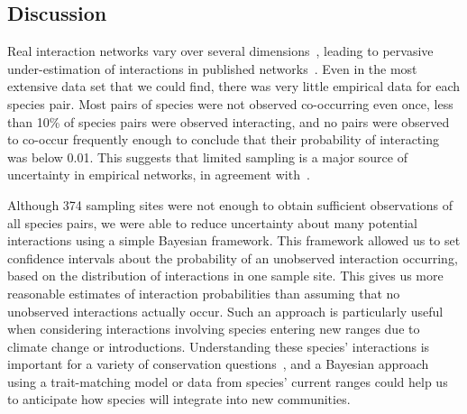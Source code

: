 \documentclass[12pt]{article}
\begin{document}
\begin{spacing}{2.0}

\section*{Discussion}


  Real interaction networks vary over several dimensions~\citep{Kitching1987,Olesen2011a,Pires2011a,Baiser2012,Fodrie2015,Novak2015}, leading to pervasive under-estimation of interactions in published networks~\citep{Jordano2016}. Even in the most extensive data set that we could find, there was very little empirical data for each species pair. Most pairs of species were not observed co-occurring even once, less than 10\% of species pairs were observed interacting, and no pairs were observed to co-occur frequently enough to conclude that their probability of interacting was below 0.01. This suggests that limited sampling is a major source of uncertainty in empirical networks, in agreement with~\citet{Jordano2016,Weinstein2017a,Weinstein2017}. 


  Although 374 sampling sites were not enough to obtain sufficient observations of all species pairs, we were able to reduce uncertainty about many potential interactions using a simple Bayesian framework. This framework allowed us to set confidence intervals about the probability of an unobserved interaction occurring, based on the distribution of interactions in one sample site. This gives us more reasonable estimates of interaction probabilities than assuming that no unobserved interactions actually occur. Such an approach is particularly useful when considering interactions involving species entering new ranges due to climate change or introductions. Understanding these species' interactions is important for a variety of conservation questions~\citep{Bartomeus2013,Gravel2013}, and a Bayesian approach using a trait-matching model or data from species' current ranges could help us to anticipate how species will integrate into new communities. 





\end{spacing}
\end{document}
